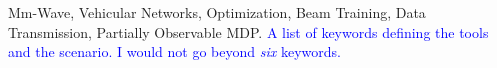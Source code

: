 \documentclass[10pt, conference, letterpaper]{IEEEtran}
\newcommand\MR[1]{\textcolor{blue}{#1}}
\begin{document}
\IEEEkeywords
Mm-Wave, Vehicular Networks, Optimization, Beam Training, Data Transmission, Partially Observable MDP. \MR{A list of keywords defining the tools and the scenario. I would not go beyond {\it six} keywords.}
\endIEEEkeywords














\end{document}
